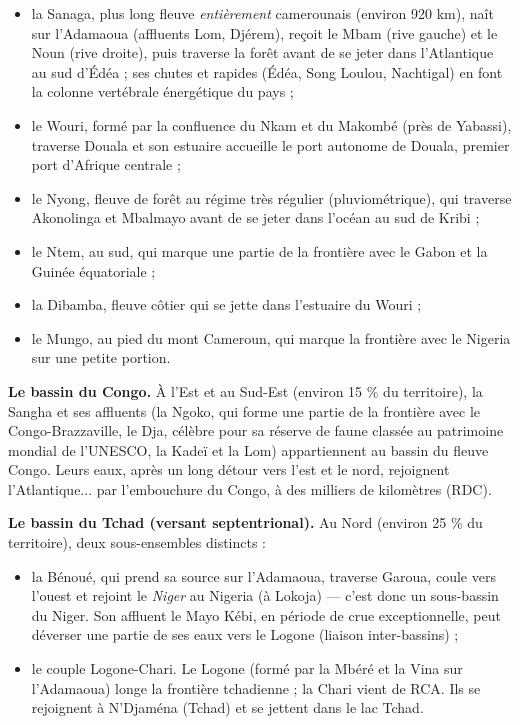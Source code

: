 \documentclass[11pt]{article}
\newcommand{\cle}[1]{{\popxbold\color{popdark}#1}}
\begin{document}
\begin{itemize}
\item la \cle{Sanaga}, plus long fleuve \emph{entièrement} camerounais (environ 920 km), naît sur l'Adamaoua (affluents Lom, Djérem), reçoit le Mbam (rive gauche) et le Noun (rive droite), puis traverse la forêt avant de se jeter dans l'Atlantique au sud d'Édéa ; ses chutes et rapides (Édéa, Song Loulou, Nachtigal) en font la colonne vertébrale énergétique du pays ;
\item le \cle{Wouri}, formé par la confluence du Nkam et du Makombé (près de Yabassi), traverse Douala et son estuaire accueille le port autonome de Douala, premier port d'Afrique centrale ;
\item le \cle{Nyong}, fleuve de forêt au régime très régulier (pluviométrique), qui traverse Akonolinga et Mbalmayo avant de se jeter dans l'océan au sud de Kribi ;
\item le \cle{Ntem}, au sud, qui marque une partie de la frontière avec le Gabon et la Guinée équatoriale ;
\item la \cle{Dibamba}, fleuve côtier qui se jette dans l'estuaire du Wouri ;
\item le \cle{Mungo}, au pied du mont Cameroun, qui marque la frontière avec le Nigeria sur une petite portion.
\end{itemize}

\textbf{Le bassin du Congo.} À l'Est et au Sud-Est (environ 15 \% du territoire), la \cle{Sangha} et ses affluents (la \cle{Ngoko}, qui forme une partie de la frontière avec le Congo-Brazzaville, le \cle{Dja}, célèbre pour sa réserve de faune classée au patrimoine mondial de l'UNESCO, la \cle{Kadeï} et la \cle{Lom}) appartiennent au bassin du fleuve Congo. Leurs eaux, après un long détour vers l'est et le nord, rejoignent l'Atlantique... par l'embouchure du Congo, à des milliers de kilomètres (RDC).

\textbf{Le bassin du Tchad (versant septentrional).} Au Nord (environ 25 \% du territoire), deux sous-ensembles distincts :
\begin{itemize}
\item la \cle{Bénoué}, qui prend sa source sur l'Adamaoua, traverse Garoua, coule vers l'ouest et rejoint le \emph{Niger} au Nigeria (à Lokoja) — c'est donc un sous-bassin du Niger. Son affluent le \cle{Mayo Kébi}, en période de crue exceptionnelle, peut déverser une partie de ses eaux vers le Logone (liaison inter-bassins) ;
\item le couple \cle{Logone}-\cle{Chari}. Le Logone (formé par la Mbéré et la Vina sur l'Adamaoua) longe la frontière tchadienne ; la Chari vient de RCA. Ils se rejoignent à N'Djaména (Tchad) et se jettent dans le lac Tchad.
\end{itemize}
\end{document}
